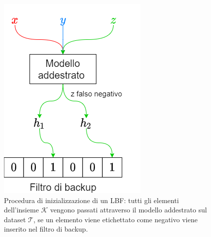 \documentclass[../../main.tex]{subfiles}
\begin{document}
    \begin{figure}[H]
        \centering
        \includegraphics[width=\textwidth/2]{immagini/5_1/LBFInizializzazione.png}
        \caption{Procedura di inizializzazione di un LBF: tutti gli elementi dell'insieme $\mathcal{K}$ vengono passati attraverso il modello addestrato sul dataset $\mathcal{T}$, se un elemento viene etichettato come negativo viene inserito nel filtro di backup.}
        \label{fig:LBFInizializzazione}
    \end{figure}
\end{document}
